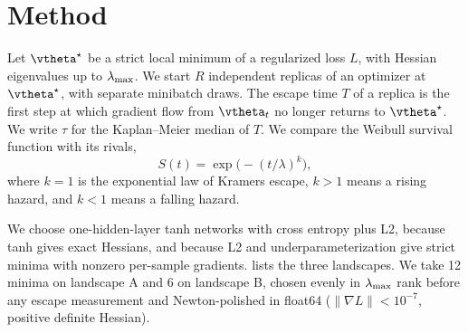 \section{Method}
\label{sec:method}

Let $\tstar$ be a strict local minimum of a regularized loss $L$, with Hessian eigenvalues up to $\lambda_{\max}$.
We start $R$ independent replicas of an optimizer at $\tstar$, with separate minibatch draws.
The escape time $T$ of a replica is the first step at which gradient flow from $\vtheta_t$ no longer returns to $\tstar$.
We write $\tau$ for the Kaplan--Meier median of $T$.
We compare the Weibull survival function with its rivals,
\begin{equation}
    S(t)=\exp\big(-(t/\lambda)^{k}\big),
    \label{eq:weibull}
\end{equation}
where $k=1$ is the exponential law of Kramers escape, $k>1$ means a rising hazard, and $k<1$ means a falling hazard.

We choose one-hidden-layer tanh networks with cross entropy plus L2, because tanh gives exact Hessians, and because L2 and underparameterization give strict minima with nonzero per-sample gradients.
 lists the three landscapes.
We take 12 minima on landscape A and 6 on landscape B, chosen evenly in $\lambda_{\max}$ rank before any escape measurement and Newton-polished in float64 ($\|\nabla L\|<10^{-7}$, positive definite Hessian).

\begin{table}[t]
    \centering
    \caption{The three landscapes. All networks have one tanh hidden layer of width $h$. Inputs for A and S are 24 PCA dimensions.}
    \label{tab:landscapes}
\end{table}

